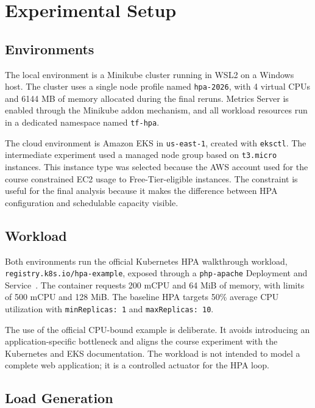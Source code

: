 \documentclass[conference]{IEEEtran}
\begin{document}
\section{Experimental Setup}

\subsection{Environments}

The local environment is a Minikube cluster running in WSL2 on a Windows host. The cluster uses a single node profile named \texttt{hpa-2026}, with 4 virtual CPUs and 6144 MB of memory allocated during the final reruns. Metrics Server is enabled through the Minikube addon mechanism, and all workload resources run in a dedicated namespace named \texttt{tf-hpa}.

The cloud environment is Amazon EKS in \texttt{us-east-1}, created with \texttt{eksctl}. The intermediate experiment used a managed node group based on \texttt{t3.micro} instances. This instance type was selected because the AWS account used for the course constrained EC2 usage to Free-Tier-eligible instances. The constraint is useful for the final analysis because it makes the difference between HPA configuration and schedulable capacity visible.

\subsection{Workload}

Both environments run the official Kubernetes HPA walkthrough workload, \texttt{registry.k8s.io/hpa-example}, exposed through a \texttt{php-apache} Deployment and Service~\cite{kubernetes_hpa_walkthrough}. The container requests 200 mCPU and 64 MiB of memory, with limits of 500 mCPU and 128 MiB. The baseline HPA targets 50\% average CPU utilization with \texttt{minReplicas: 1} and \texttt{maxReplicas: 10}.

The use of the official CPU-bound example is deliberate. It avoids introducing an application-specific bottleneck and aligns the course experiment with the Kubernetes and EKS documentation. The workload is not intended to model a complete web application; it is a controlled actuator for the HPA loop.

\subsection{Load Generation}
\end{document}
